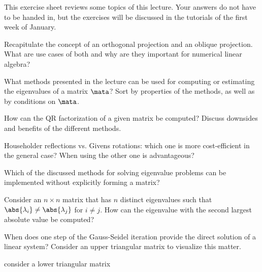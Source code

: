 
\begin{Sheet}
  \label{sheet9}


  This exercise sheet reviews some topics of this lecture. Your
  answers do not have to be handed in, but the exercises will be
  discussed in the tutorials of the first week of January.

  \begin{Problem}
    Recapitulate the concept of an orthogonal projection and an
    oblique projection. What are use cases of both and why are they
    important for numerical linear algebra?
  \end{Problem}

  \begin{Problem}
    What methods presented in the lecture can be used for computing or
    estimating the eigenvalues of a matrix $\mata$? Sort by properties
    of the methods, as well as by conditions on $\mata$.
  \end{Problem}

  \begin{Problem}
    How can the QR factorization of a given matrix be computed?
    Discuss downsides and benefits of the different methods.
  \end{Problem}

  \begin{Problem}
    Householder reflections vs. Givens rotations: which one is more
    cost-efficient in the general case? When using the other one is
    advantageous?
  \end{Problem}

  \begin{Problem}
    Which of the discussed methods for solving eigenvalue problems can
    be implemented without explicitly forming a matrix?
  \end{Problem}

  \begin{Problem}
    Consider an $n\times n$ matrix that has $n$ distinct eigenvalues
    such that $\abs{\lambda_i} \neq \abs{\lambda_j}$ for $i\neq
    j$. How can the eigenvalue with the second largest absolute value
    be computed?
  \end{Problem}

  \begin{Problem}
    When does one step of the Gauss-Seidel iteration provide the
    direct solution of a linear system? Consider an upper triangular
    matrix to visualize this matter.
    \begin{todo}
      consider a lower triangular matrix
    \end{todo}
  \end{Problem}

\end{Sheet}


